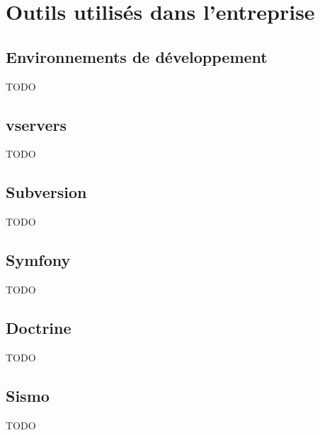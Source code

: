 \section{Outils utilisés dans l'entreprise}

\subsection{Environnements de développement}

TODO

\subsection{vservers}

TODO

\subsection{Subversion}


TODO

\subsection{Symfony}


TODO

\subsection{Doctrine}

TODO

\subsection{Sismo}

TODO
